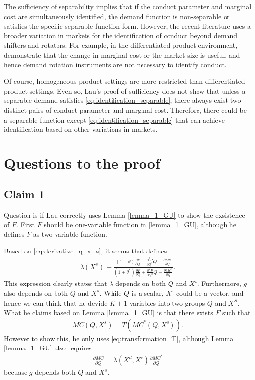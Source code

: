 \documentclass[11pt, a4paper]{article}
\theoremstyle{remark}
\begin{document}
The sufficiency of separability implies that if the conduct parameter and marginal cost are simultaneously identified, the demand function is non-separable or satisfies the specific separable function form.
However, the recent literature uses a broader variation in markets for the identification of conduct beyond demand shifters and rotators.
For example, in the differentiated product environment, \citet{berry2014identification} demonstrate that the change in marginal cost or the market size is useful, and hence demand rotation instruments are not necessary to identify conduct.

Of course, homogeneous product settings are more restricted than differentiated product settings.
Even so, Lau's proof of sufficiency does not show that unless a separable demand satisfies  \eqref{eq:identification_separable}, there always exist two distinct pairs of conduct parameter and marginal cost.
Therefore, there could be a separable function except \eqref{eq:identification_separable} that can achieve identification based on other variations in markets.


\section{Questions to the proof}

\subsection{Claim 1}

Question is if Lau correctly uses Lemma \ref{lemma_1_GU} to show the exsistence of $F$.
First $F$ should be one-variable function in  \ref{lemma_1_GU}, although he defines $F$ as two-variable function.

Based on \eqref{eq:derivative_q_x_s}, it seems that \citet{lau1982identifying} defines
\begin{align}
    \lambda( X^{s}) \equiv \frac{(1+\theta)\frac{\partial P}{\partial Q} + \frac{\partial^2 P}{\partial Q^2}Q - \frac{\partial MC}{\partial Q}}{(1+\theta^{*})\frac{\partial P}{\partial Q} + \frac{\partial^2 P}{\partial Q^2}Q - \frac{\partial MC^{*}}{\partial Q}}.
\end{align}
This expression clearly states that $\lambda$ depends on both $Q$ and $X^{s}$.
Furthermore, $g$ also depends on both $Q$ and $X^{s}$.
While $Q$ is a scalar, $X^{s}$ could be a vector, and hence we can think that he devide $K+1$ variables into two groups $Q$ and $X^{S}$.
What he claims based on Lemma \ref{lemma_1_GU} is that there exists $F$ such that
\begin{align}
    MC(Q,X^{s}) = T(MC^{*}(Q,X^{s})).
\end{align}
However to show this, he only uses \eqref{eq:transformation_T}, although Lemma \ref{lemma_1_GU} also requires 
\begin{align}
    \frac{\partial MC}{\partial Q} = \lambda(X^{d}, X^{s}) \frac{\partial MC^{*}}{\partial Q}
\end{align}
becuase $g$ depends both $Q$ and $X^{s}$.
\end{document}
